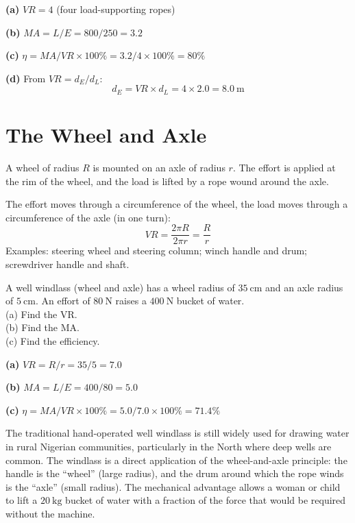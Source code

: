 \begin{solutionbox}
\textbf{(a)} $VR = 4$ (four load-supporting ropes)

\textbf{(b)} $MA = L/E = 800/250 = 3.2$

\textbf{(c)} $\eta = MA/VR \times 100\%
= 3.2/4 \times 100\% = 80\%$

\textbf{(d)} From $VR = d_E/d_L$:
\[
  d_E = VR \times d_L = 4 \times 2.0 = 8.0\ \text{m}
\]
\end{solutionbox}

\section{The Wheel and Axle}

\begin{processbox}
A wheel of radius $R$ is mounted on an axle of
radius $r$. The effort is applied at the rim of
the wheel, and the load is lifted by a rope wound
around the axle.

The effort moves through a circumference of the
wheel, the load moves through a circumference of
the axle (in one turn):
\[
  VR = \frac{2\pi R}{2\pi r} = \frac{R}{r}
\]
Examples: steering wheel and steering column;
winch handle and drum; screwdriver handle and shaft.
\end{processbox}

\begin{examplebox}[10.5]
A well windlass (wheel and axle) has a wheel
radius of $35\ \text{cm}$ and an axle radius of
$5\ \text{cm}$. An effort of $80\ \text{N}$ raises
a $400\ \text{N}$ bucket of water.\\
(a) Find the VR.\\
(b) Find the MA.\\
(c) Find the efficiency.
\end{examplebox}

\begin{solutionbox}
\textbf{(a)} $VR = R/r = 35/5 = 7.0$

\textbf{(b)} $MA = L/E = 400/80 = 5.0$

\textbf{(c)} $\eta = MA/VR \times 100\%
= 5.0/7.0 \times 100\% = 71.4\%$

\begin{realworldbox}
The traditional hand-operated well windlass is still
widely used for drawing water in rural Nigerian
communities, particularly in the North where deep
wells are common. The windlass is a direct application
of the wheel-and-axle principle: the handle is the
``wheel'' (large radius), and the drum around which
the rope winds is the ``axle'' (small radius).
The mechanical advantage allows a woman or child to
lift a $20\ \text{kg}$ bucket of water with a fraction
of the force that would be required without the machine.
\end{realworldbox}
\end{solutionbox}

